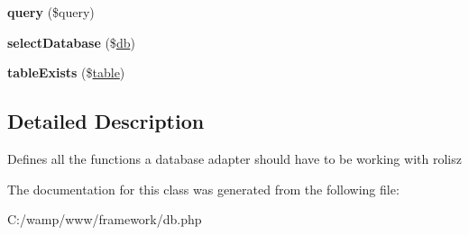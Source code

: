 \begin{DoxyCompactItemize}
\item 
\hypertarget{interfacedatabase_adapter_ac9fddec3f6bd1db128887a1b211d90f0}{
{\bfseries query} (\$query)}
\label{interfacedatabase_adapter_ac9fddec3f6bd1db128887a1b211d90f0}

\item 
\hypertarget{interfacedatabase_adapter_ab624b0b234f9db9dbc6dc4180f566b1f}{
{\bfseries selectDatabase} (\$\hyperlink{classdb}{db})}
\label{interfacedatabase_adapter_ab624b0b234f9db9dbc6dc4180f566b1f}

\item 
\hypertarget{interfacedatabase_adapter_ae7cdaa744d52a1eb0103e377023ca528}{
{\bfseries tableExists} (\$\hyperlink{classtable}{table})}
\label{interfacedatabase_adapter_ae7cdaa744d52a1eb0103e377023ca528}

\end{DoxyCompactItemize}


\subsection{Detailed Description}
Defines all the functions a database adapter should have to be working with rolisz 

The documentation for this class was generated from the following file:\begin{DoxyCompactItemize}
\item 
C:/wamp/www/framework/db.php\end{DoxyCompactItemize}
